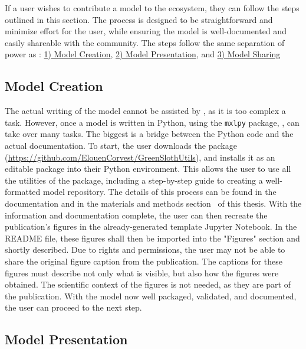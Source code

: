 If a user wishes to contribute a model to the \greensloth{} ecosystem, they can follow the steps outlined in this section. The process is designed to be straightforward and minimize effort for the user, while ensuring the model is well-documented and easily shareable with the community. The steps follow the same separation of power as \greensloth{}: \hyperref[sec:howto-creation]{1) Model Creation}, \hyperref[sec:howto-present]{2) Model Presentation}, and \hyperref[sec:howto-sharing]{3) Model Sharing}

\subsection{Model Creation}\label{sec:howto-creation}

The actual writing of the model cannot be assisted by \greensloth{}, as it is too complex a task. However, once a model is written in Python, using the \verb|mxlpy| package, \greensloth{}, can take over many tasks. The biggest is a bridge between the Python code and the actual documentation. To start, the user downloads the \greensloth[GreenSlothUtils] package (\url{https://github.com/ElouenCorvest/GreenSlothUtils}), and installs it as an editable package into their Python environment. This allows the user to use all the utilities of the \greensloth[GreenSlothUtils] package, including a step-by-step guide to creating a well-formatted model repository. The details of this process can be found in the \greensloth[GreenSlothUtils] documentation and in the materials and methods section~ of this thesis. With the information and documentation complete, the user can then recreate the publication's figures in the already-generated template Jupyter Notebook. In the README file, these figures shall then be imported into the "Figures" section and shortly described. Due to rights and permissions, the user may not be able to share the original figure caption from the publication. The captions for these figures must describe not only what is visible, but also how the figures were obtained. The scientific context of the figures is not needed, as they are part of the publication. With the model now well packaged, validated, and documented, the user can proceed to the next step.

\subsection{Model Presentation}\label{sec:howto-present}

